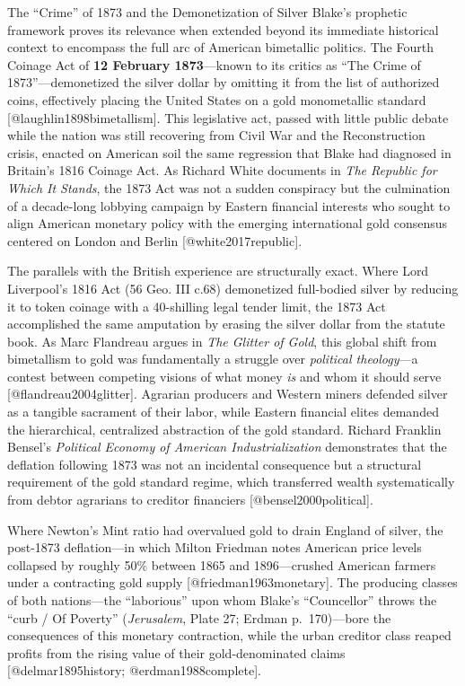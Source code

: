 \documentclass[
  ignorenonframetext,
]{beamer}
\begin{document}
\begin{frame}{The ``Crime'' of 1873 and the Demonetization of Silver}
\protect{}\label{the-crime-of-1873-and-the-demonetization-of-silver}
Blake's prophetic framework proves its relevance when extended beyond
its immediate historical context to encompass the full arc of American
bimetallic politics. The Fourth Coinage Act of \textbf{12 February
1873}---known to its critics as ``The Crime of 1873''---demonetized the
silver dollar by omitting it from the list of authorized coins,
effectively placing the United States on a gold monometallic standard
{[}@laughlin1898bimetallism{]}. This legislative act, passed with little
public debate while the nation was still recovering from Civil War and
the Reconstruction crisis, enacted on American soil the same regression
that Blake had diagnosed in Britain's 1816 Coinage Act. As Richard White
documents in \emph{The Republic for Which It Stands}, the 1873 Act was
not a sudden conspiracy but the culmination of a decade-long lobbying
campaign by Eastern financial interests who sought to align American
monetary policy with the emerging international gold consensus centered
on London and Berlin {[}@white2017republic{]}.

The parallels with the British experience are structurally exact. Where
Lord Liverpool's 1816 Act (56 Geo. III c.68) demonetized full-bodied
silver by reducing it to token coinage with a 40-shilling legal tender
limit, the 1873 Act accomplished the same amputation by erasing the
silver dollar from the statute book. As Marc Flandreau argues in
\emph{The Glitter of Gold}, this global shift from bimetallism to gold
was fundamentally a struggle over \emph{political theology}---a contest
between competing visions of what money \emph{is} and whom it should
serve {[}@flandreau2004glitter{]}. Agrarian producers and Western miners
defended silver as a tangible sacrament of their labor, while Eastern
financial elites demanded the hierarchical, centralized abstraction of
the gold standard. Richard Franklin Bensel's \emph{Political Economy of
American Industrialization} demonstrates that the deflation following
1873 was not an incidental consequence but a structural requirement of
the gold standard regime, which transferred wealth systematically from
debtor agrarians to creditor financiers {[}@bensel2000political{]}.

Where Newton's Mint ratio had overvalued gold to drain England of
silver, the post-1873 deflation---in which Milton Friedman notes
American price levels collapsed by roughly 50\% between 1865 and
1896---crushed American farmers under a contracting gold supply
{[}@friedman1963monetary{]}. The producing classes of both nations---the
``laborious'' upon whom Blake's ``Councellor'' throws the ``curb / Of
Poverty'' (\emph{Jerusalem}, Plate 27; Erdman p.~170)---bore the
consequences of this monetary contraction, while the urban creditor
class reaped profits from the rising value of their gold-denominated
claims {[}@delmar1895history; @erdman1988complete{]}.
\end{frame}
\end{document}
